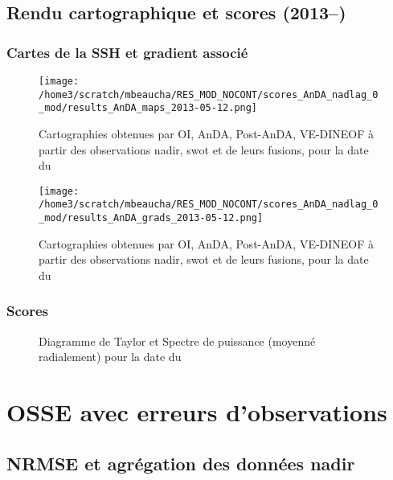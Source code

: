 \documentclass[fleqn]{report}
\begin{document}
\subsection{Rendu cartographique et scores (2013--) } 

\subsubsection{Cartes de la SSH et gradient associé}

\begin{figure}[H]
  \hspace{-2cm}\texttt{[image: /home3/scratch/mbeaucha/RES\_MOD\_NOCONT/scores\_AnDA\_nadlag\_0\_mod/results\_AnDA\_maps\_2013-05-12.png]}
  \caption{Cartographies obtenues par OI, AnDA, Post-AnDA, VE-DINEOF à partir des observations nadir, swot et de leurs fusions, pour la date du }
\end{figure} 

\begin{figure}[H]
  \hspace{-2cm}\texttt{[image: /home3/scratch/mbeaucha/RES\_MOD\_NOCONT/scores\_AnDA\_nadlag\_0\_mod/results\_AnDA\_grads\_2013-05-12.png]}
  \caption{Cartographies obtenues par OI, AnDA, Post-AnDA, VE-DINEOF à partir des observations nadir, swot et de leurs fusions, pour la date du }
\end{figure}


\subsubsection{Scores}

\begin{figure}[H]
  \centering
  \hfill
  \caption{Diagramme de Taylor et Spectre de puissance (moyenné radialement) pour la date du }
\end{figure} 

\section{OSSE avec erreurs d'observations}

\subsection{NRMSE et agrégation des données nadir}
\end{document}
